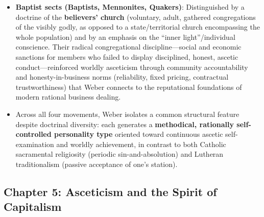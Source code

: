 \documentclass[12pt]{article}
\begin{document}
\begin{itemize}[leftmargin=*, itemsep=4pt]
    \item \textbf{Baptist sects (Baptists, Mennonites, Quakers)}: Distinguished by a doctrine of the \textbf{believers' church} (voluntary, adult, gathered congregations of the visibly godly, as opposed to a state/territorial church encompassing the whole population) and by an emphasis on the ``inner light''/individual conscience. Their radical congregational discipline---social and economic sanctions for members who failed to display disciplined, honest, ascetic conduct---reinforced worldly asceticism through community accountability and honesty-in-business norms (reliability, fixed pricing, contractual trustworthiness) that Weber connects to the reputational foundations of modern rational business dealing.
    \item Across all four movements, Weber isolates a common structural feature despite doctrinal diversity: each generates a \textbf{methodical, rationally self-controlled personality type} oriented toward continuous ascetic self-examination and worldly achievement, in contrast to both Catholic sacramental religiosity (periodic sin-and-absolution) and Lutheran traditionalism (passive acceptance of one's station).
\end{itemize}

\subsection*{Chapter 5: Asceticism and the Spirit of Capitalism}
\end{document}
